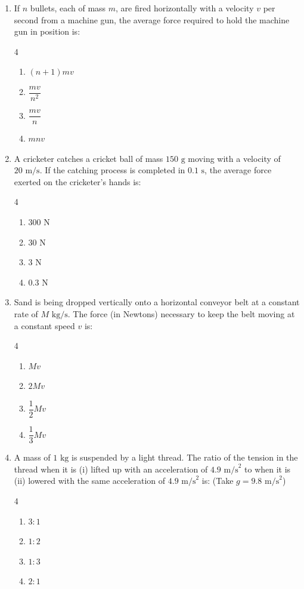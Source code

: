 \documentclass[11pt,a4paper]{article}
\begin{document}
\begin{enumerate}[label=\textbf{\arabic*.},leftmargin=18pt,itemsep=8pt]
  \item If $n$ bullets, each of mass $m$, are fired horizontally with a velocity $v$ per second from a machine gun, the average force required to hold the machine gun in position is:
  \begin{multicols}{4}
    \begin{enumerate}[label=(\Alph*)]
      \item $(n + 1)mv$
      \item $\dfrac{mv}{n^2}$
      \item $\dfrac{mv}{n}$
      \item $mnv$
    \end{enumerate}
  \end{multicols}

  \item A cricketer catches a cricket ball of mass $150\text{ g}$ moving with a velocity of $20\text{ m/s}$. If the catching process is completed in $0.1\text{ s}$, the average force exerted on the cricketer's hands is:
  \begin{multicols}{4}
    \begin{enumerate}[label=(\Alph*)]
      \item $300\text{ N}$
      \item $30\text{ N}$
      \item $3\text{ N}$
      \item $0.3\text{ N}$
    \end{enumerate}
  \end{multicols}

  \item Sand is being dropped vertically onto a horizontal conveyor belt at a constant rate of $M\text{ kg/s}$. The force (in Newtons) necessary to keep the belt moving at a constant speed $v$ is:
  \begin{multicols}{4}
    \begin{enumerate}[label=(\Alph*)]
      \item $Mv$
      \item $2Mv$
      \item $\dfrac{1}{2}Mv$
      \item $\dfrac{1}{3}Mv$
    \end{enumerate}
  \end{multicols}

  \item A mass of $1\text{ kg}$ is suspended by a light thread. The ratio of the tension in the thread when it is (i) lifted up with an acceleration of $4.9\text{ m/s}^2$ to when it is (ii) lowered with the same acceleration of $4.9\text{ m/s}^2$ is: (Take $g = 9.8\text{ m/s}^2$)
  \begin{multicols}{4}
    \begin{enumerate}[label=(\Alph*)]
      \item $3 : 1$
      \item $1 : 2$
      \item $1 : 3$
      \item $2 : 1$
    \end{enumerate}
  \end{multicols}


\end{enumerate}
\end{document}
